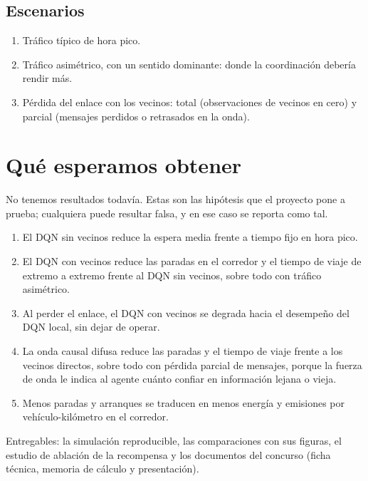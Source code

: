 \documentclass[11pt,letterpaper]{article}
\begin{document}
\subsection{Escenarios}

\begin{enumerate}
  \item Tráfico típico de hora pico.
  \item Tráfico asimétrico, con un sentido dominante: donde la coordinación debería rendir más.
  \item Pérdida del enlace con los vecinos: total (observaciones de vecinos en cero)
        y parcial (mensajes perdidos o retrasados en la onda).
\end{enumerate}

\section{Qué esperamos obtener}

No tenemos resultados todavía. Estas son las hipótesis que el proyecto pone a
prueba; cualquiera puede resultar falsa, y en ese caso se reporta como tal.

\begin{enumerate}[label=\textbf{H\arabic*.}]
  \item El DQN sin vecinos reduce la espera media frente a tiempo fijo en hora pico.
  \item El DQN con vecinos reduce las paradas en el corredor y el tiempo de viaje de
        extremo a extremo frente al DQN sin vecinos, sobre todo con tráfico asimétrico.
  \item Al perder el enlace, el DQN con vecinos se degrada hacia el desempeño del DQN
        local, sin dejar de operar.
  \item La onda causal difusa reduce las paradas y el tiempo de viaje frente a los
        vecinos directos, sobre todo con pérdida parcial de mensajes,
        porque la fuerza de onda le indica al agente cuánto confiar en información
        lejana o vieja.
  \item Menos paradas y arranques se traducen en menos energía y emisiones por
        vehículo-kilómetro en el corredor.
\end{enumerate}

Entregables: la simulación reproducible, las comparaciones con sus figuras, el
estudio de ablación de la recompensa y los documentos del concurso (ficha técnica, memoria de cálculo y presentación).
\end{document}
